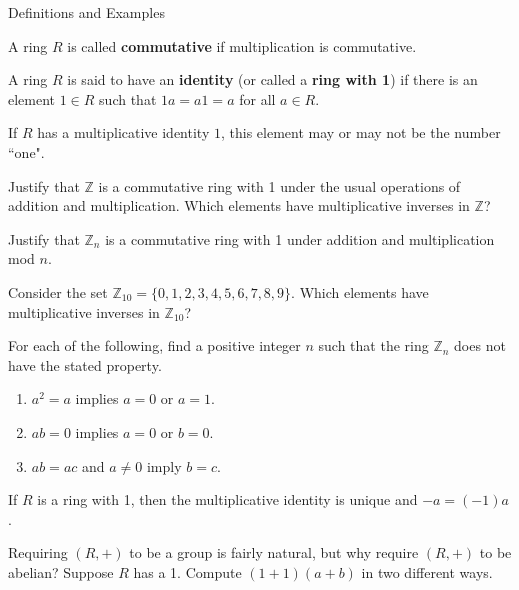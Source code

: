\begin{section}{Definitions and Examples}
\begin{definition}
A ring $R$ is called \textbf{commutative} if multiplication is commutative.
\end{definition}

\begin{definition}
A ring $R$ is said to have an \textbf{identity} (or called a \textbf{ring with  1}) if there is an element $1\in R$ such that $1a=a 1=a$ for all $a\in R$.
\end{definition}

If $R$ has a multiplicative identity $1$, this element may or may not be the number ``one".

\begin{problem}
Justify that $\mathbb{Z}$ is a commutative ring with 1 under the usual operations of addition and multiplication. Which elements have multiplicative inverses in $\mathbb{Z}$?
\end{problem}

\begin{problem}
Justify that $\mathbb{Z}_n$ is a commutative ring with 1 under addition and multiplication mod $n$.
\end{problem}

\begin{problem}\label{prob:Z10Ring}
Consider the set $\mathbb{Z}_{10}=\{0,1,2,3,4,5,6,7,8,9\}$. Which elements have multiplicative inverses in $\mathbb{Z}_{10}$?
\end{problem}

\begin{problem}
For each of the following, find a positive integer $n$ such that the ring $\mathbb{Z}_n$ does not have the stated property.
\begin{enumerate}[label=\textrm{(\alph*)}]
\item $a^2=a$ implies $a=0$ or $a=1$.
\item $ab=0$ implies $a=0$ or $b=0$.
\item $ab=ac$ and $a\neq 0$ imply $b=c$.
\end{enumerate}
\end{problem}

\begin{theorem}
If $R$ is a ring with 1, then the multiplicative identity is unique and $-a=(-1)a$.
\end{theorem}

\begin{problem}
Requiring $(R,+)$ to be a group is fairly natural, but why require $(R,+)$ to be abelian?  Suppose $R$ has a 1.  Compute $(1+1)(a+b)$ in two different ways.
\end{problem}


\end{section}
